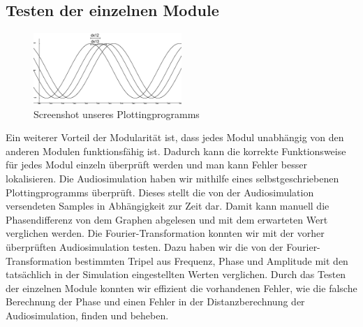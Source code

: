 \subsection{Testen der einzelnen Module}
\begin{figure}
    \centering
    \includegraphics[width=0.5\textwidth]{img/glplot}
    \caption{Screenshot unseres Plottingprogramms\label{fig:glplot}}
\end{figure}
Ein weiterer Vorteil der Modularität ist, dass jedes Modul unabhängig von den anderen Modulen funktionsfähig ist. Dadurch kann die korrekte Funktionsweise für jedes Modul einzeln überprüft werden und man kann Fehler besser lokalisieren.
Die Audiosimulation haben wir mithilfe eines selbstgeschriebenen Plottingprogramms überprüft. Dieses stellt die von der Audiosimulation versendeten Samples in Abhängigkeit zur Zeit dar. Damit kann manuell die Phasendifferenz von dem Graphen abgelesen und mit dem erwarteten Wert verglichen werden.
Die Fourier-Transformation konnten wir mit der vorher überprüften Audiosimulation testen. Dazu haben wir die von der Fourier-Transformation bestimmten Tripel aus Frequenz, Phase und Amplitude mit den tatsächlich in der Simulation eingestellten Werten verglichen.
Durch das Testen der einzelnen Module konnten wir effizient die vorhandenen Fehler, wie die falsche Berechnung der Phase und einen Fehler in der Distanzberechnung der Audiosimulation, finden und beheben.
